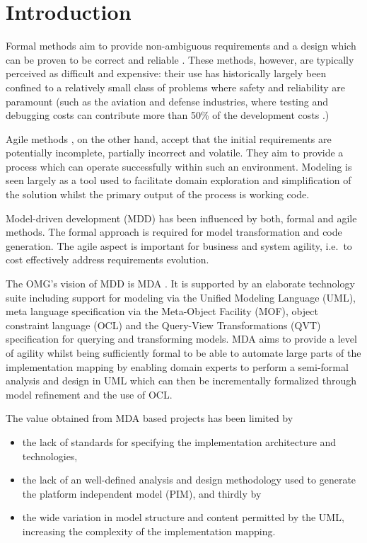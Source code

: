 \section{Introduction}
\label{sec:introduction}

Formal methods aim to provide non-ambiguous requirements and a design
which can be proven to be correct and reliable \cite{Monin:understandingFormalMethods}.
These methods, however, are typically perceived as difficult and expensive: their
use has historically largely been confined to a relatively small class of problems
where safety and reliability are paramount (such as the aviation \cite{hall:formalMethodsInRealAirTraffic}
and defense industries, where testing and debugging costs can contribute more
than 50\% of the development costs
\cite{platzer:verificationOfCyberphysicalTransportationSystems}.)

Agile methods \cite{agileManifesto, martin:agileSoftwareDevelopment},
on the other hand, accept that the initial requirements are potentially
incomplete, partially incorrect and volatile. They aim to provide a process which
can operate successfully within such an environment. Modeling is seen
largely as a tool used to facilitate domain exploration and simplification
of the solution whilst the primary output of the process is working code.

Model-driven development (MDD)
\cite{stahl:mdsd, france:mddUsingUml2} has been
influenced by both, formal \cite{oquendo:modelDrivenFormalMethod}
and agile \cite{lazar:agileMdaForSoa, solms:generatingMdasPimUsingUrdad}
methods. The formal approach is
required for model transformation and code generation. The agile aspect
is important for business and system agility, i.e.\ to cost effectively
address requirements evolution. 

The OMG's vision of MDD is MDA \cite{siegel:developingInMDA}.
It is supported by an elaborate technology suite including support for modeling
via the Unified Modeling Language (UML), meta language specification via the
Meta-Object Facility (MOF), object constraint language (OCL) and
the Query-View Transformations (QVT) specification for querying and
transforming models. MDA aims to provide a level of agility whilst being
sufficiently formal to be able to automate large parts of the implementation 
mapping \cite{***TODO***}
by enabling domain experts to perform a semi-formal analysis and design
in UML which can then be incrementally formalized through model refinement
and the use of OCL.


The value obtained from MDA based projects has been limited by
\cite{solms:generatingMdasPimUsingUrdad}
\begin{itemize}
  \item the lack of standards for specifying the implementation architecture and technologies,
  \item the lack of an well-defined analysis and design methodology used to generate
the platform independent model (PIM), and thirdly by
  \item the wide variation in model structure and content permitted by the UML, increasing
the complexity of the implementation mapping.
\end{itemize}

